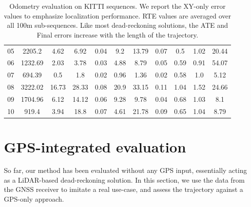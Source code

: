 \begin{table}[h]
{\begin{tabular}{c|c|ccc|ccc|ccc}
            05            & 2205.2          & 4.62                              & 6.92                                & 0.04                                         & 9.2         & 13.79         & 0.07          & 0.5         & 1.02          & 20.44         \\
            06            & 1232.69         & 2.03                              & 3.78                                & 0.03                                         & 4.88        & 8.79          & 0.05          & 0.59        & 0.91          & 54.07         \\
            07            & 694.39          & 0.5                               & 1.8                                 & 0.02                                         & 0.96        & 1.36          & 0.02          & 0.58        & 1.0           & 5.12          \\
            08            & 3222.02         & 16.73                             & 28.33                               & 0.08                                         & 20.9        & 33.15         & 0.11          & 1.04        & 1.52          & 24.66         \\
            09            & 1704.96         & 6.12                              & 14.12                               & 0.06                                         & 9.28        & 9.78          & 0.04          & 0.68        & 1.03          & 8.1           \\
            10            & 919.4           & 3.94                              & 18.8                                & 0.07                                         & 4.61        & 21.78         & 0.09          & 0.65        & 1.04          & 8.79          \\
            \hline
        \end{tabular}
    }
    \caption{Odometry evaluation on KITTI sequences. We report the XY-only error values to emphasize localization performance. RTE values are averaged over all 100m sub-sequences. Like most dead-reckoning solutions, the ATE and Final errors increase with the length of the trajectory.}
    \label{tab:odom-kitti}
\end{table}

\section{GPS-integrated evaluation}

So far, our method has been evaluated without any GPS input, essentially acting as a LiDAR-based dead-reckoning solution. In this section, we use the data from the GNSS receiver to imitate a real use-case, and assess the trajectory against a GPS-only approach.

